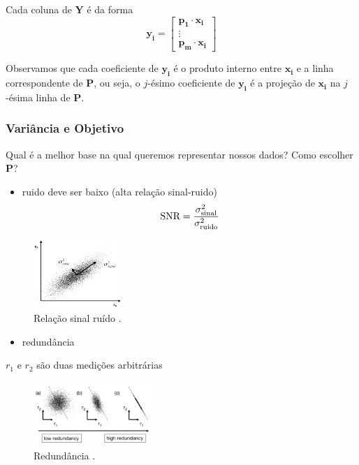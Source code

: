 \begin{frame}[allowframebreaks]
  \framebreak

  Cada coluna de $\mathbf{Y}$ é da forma
  \begin{equation}
  \mathbf{y_i} = \begin{bmatrix} \mathbf{p_1} \cdot \mathbf{x_i} \\ \vdots \\ \mathbf{p_m} \cdot \mathbf{x_i} \end{bmatrix}
  \end{equation}

  Observamos que cada coeficiente de $\mathbf{y_i}$ é o produto interno entre $\mathbf{x_i}$ e a linha correspondente de $\mathbf{P}$, ou seja,
  o $j$-ésimo coeficiente de $\mathbf{y_i}$ é a projeção de $\mathbf{x_i}$ na $j$-ésima linha de $\mathbf{P}$.

\end{frame}

\begin{frame}[allowframebreaks]
  \frametitle{Variância e Objetivo}
  Qual é a melhor base na qual queremos representar nossos dados? Como escolher $\mathbf{P}$?

  \begin{itemize}
  \item ruido deve ser baixo (alta relação sinal-ruido)
  \begin{equation}
  \textmd{SNR} = \frac{\sigma^2_{\textmd{sinal}}}{\sigma^2_{\textmd{ruido}}}
  \end{equation}
  \end{itemize}
  \vspace{-0.25cm}
  \begin{figure}[h!]
  \centering
  \includegraphics[width=0.3\textwidth]{images/snr.png}
  \caption{Relação sinal ruído \citep{shlens2014}.}
  \label{fig:snr}
  \end{figure}

  \framebreak

  \begin{itemize}
  \item redundância
  \end{itemize}

  $r_1$ e $r_2$ são duas medições arbitrárias 
  \begin{figure}[h!]
  \centering
  \includegraphics[width=0.4\textwidth]{images/redundancy.png}
  \caption{Redundância \citep{shlens2014}.}
  \label{fig:redundancy}
  \end{figure}
 
\end{frame}

